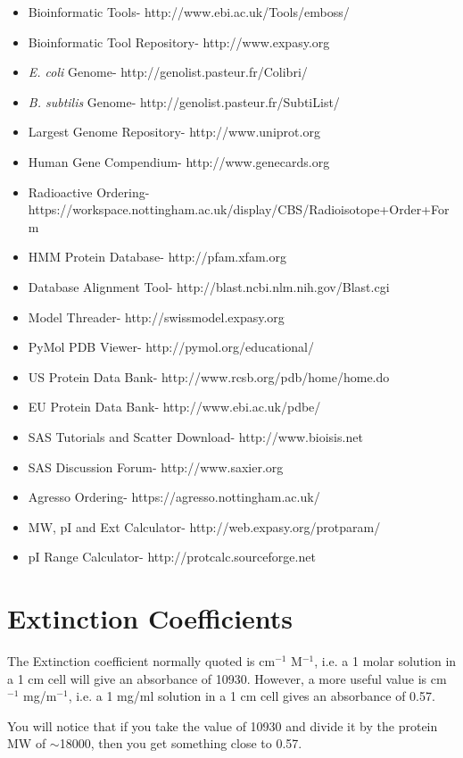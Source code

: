 \documentclass{tufte-book} %
\begin{document}
\begin{itemize}
\item Bioinformatic Tools- http://www.ebi.ac.uk/Tools/emboss/
\item Bioinformatic Tool Repository- http://www.expasy.org
\item \textit{E. coli} Genome- http://genolist.pasteur.fr/Colibri/
\item \textit{B. subtilis} Genome- http://genolist.pasteur.fr/SubtiList/
\item Largest Genome Repository- http://www.uniprot.org
\item Human Gene Compendium- http://www.genecards.org
\item Radioactive Ordering- https://workspace.nottingham.ac.uk/display/CBS/Radioisotope+Order+Form
\item HMM Protein Database- http://pfam.xfam.org
\item Database Alignment Tool- http://blast.ncbi.nlm.nih.gov/Blast.cgi
\item Model Threader- http://swissmodel.expasy.org
\item PyMol PDB Viewer- http://pymol.org/educational/
\item US Protein Data Bank- http://www.rcsb.org/pdb/home/home.do
\item EU Protein Data Bank- http://www.ebi.ac.uk/pdbe/
\item SAS Tutorials and Scatter Download- http://www.bioisis.net
\item SAS Discussion Forum- http://www.saxier.org
\item Agresso Ordering- https://agresso.nottingham.ac.uk/
\item MW, pI and Ext Calculator- http://web.expasy.org/protparam/
\item pI Range Calculator- http://protcalc.sourceforge.net


\end{itemize}


\section{Extinction Coefficients}

The Extinction coefficient normally quoted is cm$^{-1}$ M$^{-1}$, i.e. a 1 molar solution in a 1 cm cell will give an absorbance of 10930. However, a more useful value is cm$^{-1}$ mg/m$^{-1}$, i.e. a 1 mg/ml solution in a 1 cm cell gives an absorbance of 0.57.

You will notice that if you take the value of 10930 and divide it by the protein MW of $\sim$18000, then you get something close to 0.57. 
\end{document}
